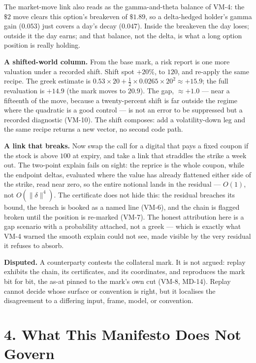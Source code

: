 \documentclass[11pt,a4paper]{article}
\begin{document}
The market-move link also reads as the gamma-and-theta balance of VM-4:
the $\$2$ move clears this option's breakeven of $\$1.89$, so a
delta-hedged holder's gamma gain ($0.053$) just covers a day's decay
($0.047$). Inside the breakeven the day loses; outside it the day earns;
and that balance, not the delta, is what a long option position is really
holding.

\textbf{A shifted-world column.} From the base mark, a risk report is one
more valuation under a recorded shift. Shift spot $+20\%$, to $120$, and
re-apply the same recipe. The greek estimate is
$0.53\!\times\!20 + \tfrac12\!\times\!0.0265\!\times\!20^2 \approx +15.9$;
the full revaluation is $+14.9$ (the mark moves to $20.9$). The gap,
$\approx +1.0$ --- near a fifteenth of the move, because a twenty-percent
shift is far outside the regime where the quadratic is a good control ---
is not an error to be suppressed but a recorded diagnostic (VM-10). The
shift composes: add a volatility-down leg and the same recipe returns a new
vector, no second code path.

\textbf{A link that breaks.} Now swap the call for a digital that pays a
fixed coupon if the stock is above $100$ at expiry, and take a link that
straddles the strike a week out. The two-point explain fails on sight: the
reprice is the whole coupon, while the endpoint deltas, evaluated where the
value has already flattened either side of the strike, read near zero, so
the entire notional lands in the residual --- $O(1)$, not
$O(\lVert\delta\rVert^4)$. The certificate does not hide this: the residual
breaches its bound, the breach is booked as a named line (VM-6), and the
chain is flagged broken until the position is re-marked (VM-7). The honest
attribution here is a gap scenario with a probability attached, not a
greek --- which is exactly what VM-4 warned the smooth explain could not
see, made visible by the very residual it refuses to absorb.

\textbf{Disputed.} A counterparty contests the collateral mark. It is not
argued: replay exhibits the chain, its certificates, and its coordinates,
and reproduces the mark bit for bit, the as-at pinned to the mark's own cut
(VM-8, MD-14). Replay cannot decide whose surface or convention is right,
but it localises the disagreement to a differing input, frame, model, or
convention.

\section{4. What This Manifesto Does Not Govern}
\end{document}
